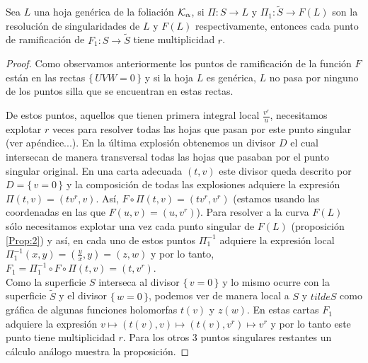 \begin{Proposicion}
\label{Prop:OrdenDeRamificacion}
Sea $L$ una hoja genérica de la foliación $\mathcal{K}_{\alpha}$, si $\Pi\colon S\rightarrow L$ y $\Pi_{1}\colon\tilde{S}\rightarrow F(L)$ son la resolución de singularidades de $L$ y $F(L)$ respectivamente, entonces cada punto de ramificación de $F_{1}\colon S\rightarrow\tilde{S}$ tiene multiplicidad $r$.
\end{Proposicion}
\begin{proof} 
Como observamos anteriormente los puntos de ramificación de la función $F$ están en las rectas $\{\,  UVW=0\,\}$ y si la hoja $L$ es genérica, $L$ no pasa por ninguno de los puntos silla que se encuentran en estas rectas.

 De estos puntos, aquellos que tienen primera integral local $\tfrac{v^{r}}{u}$, necesitamos explotar $r$ veces para resolver todas las hojas que pasan por este punto singular (ver apéndice...). En la última explosión obtenemos un divisor $D$ el cual intersecan de manera transversal todas las hojas que pasaban por el punto singular original. En una carta adecuada $(t,v)$ este divisor queda descrito por $D=\{\, v=0\, \}$ y la composición de todas las explosiones adquiere la expresión $\Pi(t,v)=(tv^{r},v)$. Así, $F\circ\Pi(t,v)=(tv^{r},v^{r})$ (estamos usando las coordenadas en las que $F(u,v)=(u,v^{r})$). Para resolver a la curva $F(L)$ sólo necesitamos explotar una vez cada punto singular de $F(L)$ (proposición \ref{Prop:2}) y así, en cada uno de estos puntos $\Pi_{1}^{-1}$ adquiere la expresión local $\Pi_{1}^{-1}(x,y)=(\tfrac{y}{x},y)=(z,w)$ y por lo tanto, $F_{1}=\Pi_{1}^{-1}\circ F\circ\Pi(t,v)=(t,v^{r})$.\\

Como la superficie $S$ interseca al divisor $\{\, v=0\, \}$ y lo mismo ocurre con la superficie $\tilde{S}$ y el divisor $\{\, w=0\, \}$, podemos ver de manera local a $S$ y $tilde{S}$ como gráfica de algunas funciones holomorfas $t(v)$ y $z(w)$. En estas cartas $F_{1}$ adquiere la expresión $v\mapsto (t(v),v)\mapsto (t(v),v^{r})\mapsto v^{r}$ y por lo tanto este punto tiene multiplicidad $r$. Para los otros 3 puntos singulares restantes un cálculo análogo muestra la proposición.
\end{proof} 

